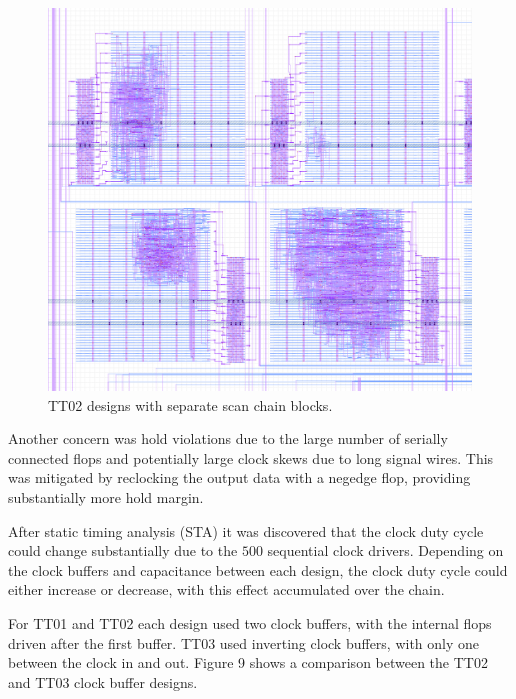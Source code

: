 \begin{figure}[htp]
\centering
\includegraphics[width=\columnwidth]{./Figs/tt02_gds_zoom.png}
\caption{TT02 designs with separate scan chain blocks.}
\label{fig:TT02_separate_scan_blocks}
\end{figure}


Another concern was hold violations due to the large number of serially connected flops and potentially large clock skews due to long signal wires.  This was mitigated by reclocking the output data with a negedge flop, providing substantially more hold margin.

After static timing analysis (STA) it was discovered that the clock duty cycle could change substantially due to the \(500\) sequential clock drivers. Depending on the clock buffers and capacitance between each design, the clock duty cycle could either increase or decrease, with this effect accumulated over the chain.

For TT01 and TT02 each design used two clock buffers, with the internal flops driven after the first buffer.
TT03 used inverting clock buffers, with only one between the clock in and out. Figure 9 shows a comparison between the TT02 and TT03 clock buffer designs.

